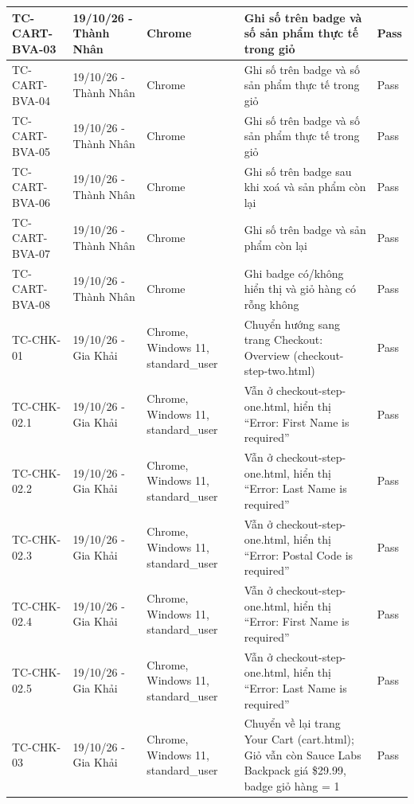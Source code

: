 {\begin{longtable}{|L{3.4cm}|L{2.6cm}|L{2.6cm}|L{4.7cm}|L{1.4cm}|}
\hline
\mbox{TC-CART-BVA-03} & 19/10/26 - Thành Nhân & Chrome & Ghi số trên badge và số sản phẩm thực tế trong giỏ & \textcolor{passgreen}{Pass} \\
\hline
\mbox{TC-CART-BVA-04} & 19/10/26 - Thành Nhân & Chrome & Ghi số trên badge và số sản phẩm thực tế trong giỏ & \textcolor{passgreen}{Pass} \\
\hline
\mbox{TC-CART-BVA-05} & 19/10/26 - Thành Nhân & Chrome & Ghi số trên badge và số sản phẩm thực tế trong giỏ & \textcolor{passgreen}{Pass} \\
\hline
\mbox{TC-CART-BVA-06} & 19/10/26 - Thành Nhân & Chrome & Ghi số trên badge sau khi xoá và sản phẩm còn lại & \textcolor{passgreen}{Pass} \\
\hline
\mbox{TC-CART-BVA-07} & 19/10/26 - Thành Nhân & Chrome & Ghi số trên badge và sản phẩm còn lại & \textcolor{passgreen}{Pass} \\
\hline
\mbox{TC-CART-BVA-08} & 19/10/26 - Thành Nhân & Chrome & Ghi badge có/không hiển thị và giỏ hàng có rỗng không & \textcolor{passgreen}{Pass} \\
\hline
\mbox{TC-CHK-01} & 19/10/26 - Gia Khải & Chrome, Windows 11, standard\_\allowbreak{}user & Chuyển hướng sang trang Checkout: Overview (checkout-step-two.html) & \textcolor{passgreen}{Pass} \\
\hline
\mbox{TC-CHK-02.1} & 19/10/26 - Gia Khải & Chrome, Windows 11, standard\_\allowbreak{}user & Vẫn ở checkout-step-one.html, hiển thị ``Error: First Name is required'' & \textcolor{passgreen}{Pass} \\
\hline
\mbox{TC-CHK-02.2} & 19/10/26 - Gia Khải & Chrome, Windows 11, standard\_\allowbreak{}user & Vẫn ở checkout-step-one.html, hiển thị ``Error: Last Name is required'' & \textcolor{passgreen}{Pass} \\
\hline
\mbox{TC-CHK-02.3} & 19/10/26 - Gia Khải & Chrome, Windows 11, standard\_\allowbreak{}user & Vẫn ở checkout-step-one.html, hiển thị ``Error: Postal Code is required'' & \textcolor{passgreen}{Pass} \\
\hline
\mbox{TC-CHK-02.4} & 19/10/26 - Gia Khải & Chrome, Windows 11, standard\_\allowbreak{}user & Vẫn ở checkout-step-one.html, hiển thị ``Error: First Name is required'' & \textcolor{passgreen}{Pass} \\
\hline
\mbox{TC-CHK-02.5} & 19/10/26 - Gia Khải & Chrome, Windows 11, standard\_\allowbreak{}user & Vẫn ở checkout-step-one.html, hiển thị ``Error: Last Name is required'' & \textcolor{passgreen}{Pass} \\
\hline
\mbox{TC-CHK-03} & 19/10/26 - Gia Khải & Chrome, Windows 11, standard\_\allowbreak{}user & Chuyển về lại trang Your Cart (cart.html); Giỏ vẫn còn Sauce Labs Backpack giá \$29.99, badge giỏ hàng = 1 & \textcolor{passgreen}{Pass} \\

\end{longtable}}
